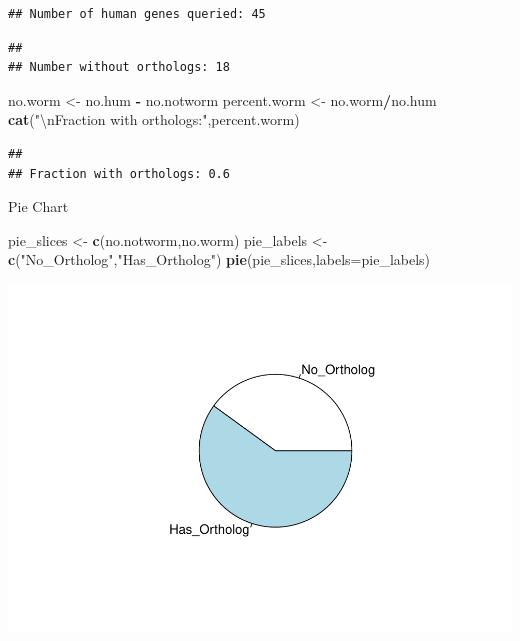 \documentclass[
]{article}
\newenvironment{Shaded}{\begin{snugshade}}{\end{snugshade}}
\newcommand{\CharTok}[1]{\textcolor[rgb]{0.31,0.60,0.02}{#1}}
\newcommand{\DataTypeTok}[1]{\textcolor[rgb]{0.13,0.29,0.53}{#1}}
\newcommand{\KeywordTok}[1]{\textcolor[rgb]{0.13,0.29,0.53}{\textbf{#1}}}
\newcommand{\NormalTok}[1]{#1}
\newcommand{\OperatorTok}[1]{\textcolor[rgb]{0.81,0.36,0.00}{\textbf{#1}}}
\newcommand{\StringTok}[1]{\textcolor[rgb]{0.31,0.60,0.02}{#1}}
\begin{document}
\begin{verbatim}
## Number of human genes queried: 45
\end{verbatim}

\begin{Shaded}
\end{Shaded}

\begin{verbatim}
## 
## Number without orthologs: 18
\end{verbatim}

\begin{Shaded}
\begin{Highlighting}[]
\NormalTok{no.worm <-}\StringTok{ }\NormalTok{no.hum }\OperatorTok{-}\StringTok{ }\NormalTok{no.notworm}
\NormalTok{percent.worm <-}\StringTok{ }\NormalTok{no.worm}\OperatorTok{/}\NormalTok{no.hum}
\KeywordTok{cat}\NormalTok{(}\StringTok{"}\CharTok{\textbackslash{}n}\StringTok{Fraction with orthologs:"}\NormalTok{,percent.worm)}
\end{Highlighting}
\end{Shaded}

\begin{verbatim}
## 
## Fraction with orthologs: 0.6
\end{verbatim}

Pie Chart

\begin{Shaded}
\begin{Highlighting}[]
\NormalTok{pie_slices <-}\StringTok{ }\KeywordTok{c}\NormalTok{(no.notworm,no.worm)}
\NormalTok{pie_labels <-}\StringTok{ }\KeywordTok{c}\NormalTok{(}\StringTok{"No_Ortholog"}\NormalTok{,}\StringTok{"Has_Ortholog"}\NormalTok{)}
\KeywordTok{pie}\NormalTok{(pie_slices,}\DataTypeTok{labels=}\NormalTok{pie_labels)}
\end{Highlighting}
\end{Shaded}

\includegraphics{Thesis_DualCodeTest_files/figure-latex/unnamed-chunk-45-1.pdf}
\end{document}
